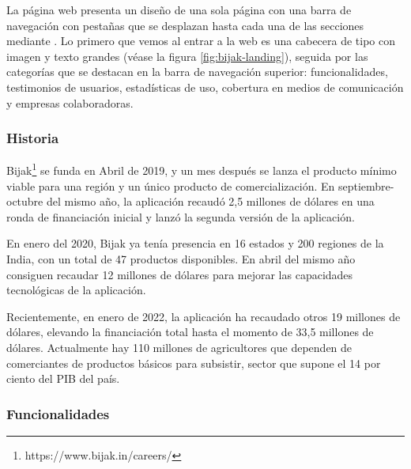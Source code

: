 La página web presenta un diseño de una sola página con una barra de navegación con pestañas que se desplazan hasta cada una de las secciones mediante . Lo primero que vemos al entrar a la web es una cabecera de tipo  con imagen y texto grandes (véase la figura \ref{fig:bijak-landing}), seguida por las categorías que se destacan en la barra de navegación superior: funcionalidades, testimonios de usuarios, estadísticas de uso, cobertura en medios de comunicación y empresas colaboradoras.


\subsubsection{Historia}

Bijak\footnote{https://www.bijak.in/careers/} se funda en Abril de 2019, y un mes después se lanza el producto mínimo viable para una región y un único producto de comercialización. En septiembre-octubre del mismo año, la aplicación recaudó 2,5 millones de dólares en una ronda de financiación inicial y lanzó la segunda versión de la aplicación.

En enero del 2020, Bijak ya tenía presencia en 16 estados y 200 regiones de la India, con un total de 47 productos disponibles. En abril del mismo año consiguen recaudar 12 millones de dólares para mejorar las capacidades tecnológicas de la aplicación.

Recientemente, en enero de 2022, la aplicación ha recaudado otros 19 millones de dólares, elevando la financiación total hasta el momento de 33,5 millones de dólares. Actualmente hay 110 millones de agricultores que dependen de comerciantes de productos básicos para subsistir, sector que supone el 14 por ciento del PIB del país.

\subsubsection{Funcionalidades}

